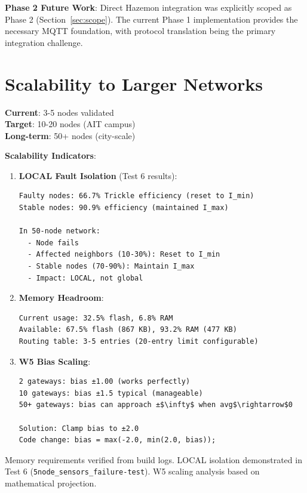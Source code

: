 \textbf{Phase 2 Future Work}: Direct Hazemon integration was explicitly scoped as Phase 2 (Section~\ref{sec:scope}). The current Phase 1 implementation provides the necessary MQTT foundation, with protocol translation being the primary integration challenge.

\section{Scalability to Larger Networks}

\textbf{Current}: 3-5 nodes validated \\
\textbf{Target}: 10-20 nodes (AIT campus) \\
\textbf{Long-term}: 50+ nodes (city-scale)

\textbf{Scalability Indicators}:

\begin{enumerate}
\item \textbf{LOCAL Fault Isolation} (Test 6 results):
\begin{verbatim}
Faulty nodes: 66.7% Trickle efficiency (reset to I_min)
Stable nodes: 90.9% efficiency (maintained I_max)

In 50-node network:
  - Node fails
  - Affected neighbors (10-30%): Reset to I_min
  - Stable nodes (70-90%): Maintain I_max
  - Impact: LOCAL, not global
\end{verbatim}

\item \textbf{Memory Headroom}:
\begin{verbatim}
Current usage: 32.5% flash, 6.8% RAM
Available: 67.5% flash (867 KB), 93.2% RAM (477 KB)
Routing table: 3-5 entries (20-entry limit configurable)
\end{verbatim}

\item \textbf{W5 Bias Scaling}:
\begin{verbatim}
2 gateways: bias ±1.00 (works perfectly)
10 gateways: bias ±1.5 typical (manageable)
50+ gateways: bias can approach ±$\infty$ when avg$\rightarrow$0

Solution: Clamp bias to ±2.0
Code change: bias = max(-2.0, min(2.0, bias));
\end{verbatim}
\end{enumerate}

Memory requirements verified from build logs. LOCAL isolation demonstrated in Test 6 (\texttt{5node\_sensors\_failure-test}). W5 scaling analysis based on mathematical projection.

